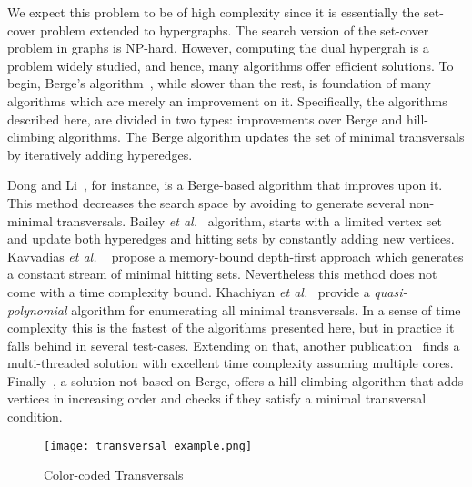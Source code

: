 We expect this problem to be of high complexity since it is essentially the set-cover problem extended to hypergraphs. The search version of the set-cover problem in graphs is NP-hard. However, computing the dual hypergrah is a problem widely studied, and hence, many algorithms offer efficient solutions. To begin, Berge's algorithm~\cite{berge1989hypergraphs}, while slower than the rest, is foundation of many algorithms which are merely an improvement on it. Specifically, the algorithms described here, are divided in two types: improvements over Berge and hill-climbing algorithms. The Berge algorithm updates the set of minimal transversals by iteratively adding hyperedges.

Dong and Li~\cite{dong2005mining}, for instance, is a Berge-based algorithm that improves upon it. This method decreases the search space by avoiding to generate several non-minimal transversals. Bailey {\em et al.}~\cite{bailey2003fast} algorithm, starts with a limited vertex set and update both hyperedges and hitting sets by constantly adding new vertices. Kavvadias {\em et al.}
~\cite{kavvadias2005efficient} propose a memory-bound depth-first approach which generates a constant stream of minimal hitting sets. Nevertheless this method does not come with a time complexity bound. Khachiyan {\em et al.}~\cite{boros2003efficient} provide a {\em quasi-polynomial} algorithm for enumerating all minimal transversals. In a sense of time complexity this is the fastest of the algorithms presented here, but in practice it falls behind in several test-cases. Extending on that, another publication~\cite{khachiyan2005new} finds a multi-threaded solution with excellent time complexity assuming multiple cores. Finally~\cite{hebert2007data}, a solution not based on Berge, offers a hill-climbing algorithm that adds vertices in increasing order and checks if they satisfy a minimal transversal condition.
\begin{figure}
	\texttt{[image: transversal\_example.png]}
	\caption{Color-coded Transversals}
	\label{transversalexample}
\end{figure}


